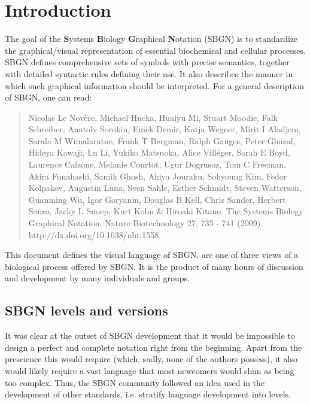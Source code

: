 
\chapter{Introduction}

The goal of the \textbf{S}ystems \textbf{B}iology \textbf{G}raphical \textbf{N}otation (SBGN) is to standardize the graphical/visual representation of essential biochemical and cellular processes. SBGN defines comprehensive sets of symbols with precise semantics, together with detailed syntactic rules defining their use.  It also describes the manner in which such graphical information should be interpreted. For a general description of SBGN, one can read:

\begin{quote}
Nicolas Le Nov\`{e}re, Michael Hucka, Huaiyu Mi, Stuart Moodie, Falk Schreiber, Anatoly Sorokin, Emek Demir, Katja Wegner, Mirit I Aladjem, Sarala M Wimalaratne, Frank T Bergman, Ralph Gauges, Peter Ghazal, Hideya Kawaji, Lu Li, Yukiko Matsuoka, Alice Vill\'{e}ger, Sarah E Boyd, Laurence Calzone, Melanie Courtot, Ugur Dogrusoz, Tom C Freeman, Akira Funahashi, Samik Ghosh, Akiya Jouraku, Sohyoung Kim, Fedor Kolpakov, Augustin Luna, Sven Sahle, Esther Schmidt, Steven Watterson, Guanming Wu, Igor Goryanin, Douglas B Kell, Chris Sander, Herbert Sauro, Jacky L Snoep, Kurt Kohn  \& Hiroaki Kitano. The Systems Biology Graphical Notation. Nature Biotechnology 27, 735 - 741 (2009).  http://dx.doi.org/10.1038/nbt.1558
\end{quote}

This document defines the \emph{\AF{}} visual language of SBGN. \AFs are one of three views of a biological process offered by SBGN.  It is the product of many hours of discussion and development by many individuals and groups.

\section{SBGN levels and versions}
\label{sec:sbgn-levels}

It was clear at the outset of SBGN development that it would be impossible to design a perfect and complete notation right from the beginning.  Apart from the prescience this would require (which, sadly, none of the authors possess), it also would likely require a vast language that most newcomers would shun as being too complex.  Thus, the SBGN community followed an idea used in the development of other standards, i.e. stratify language development into levels.

